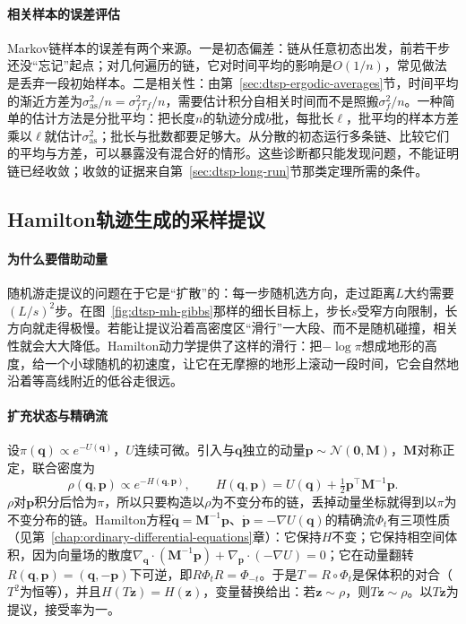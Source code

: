 \paragraph{相关样本的误差评估}
Markov链样本的误差有两个来源。一是初态偏差：链从任意初态出发，前若干步还没“忘记”起点；对几何遍历的链，它对时间平均的影响是$O(1/n)$，常见做法是丢弃一段初始样本。二是相关性：由第~\ref{sec:dtsp-ergodic-averages}节，时间平均的渐近方差为$\sigma_{\mathrm{as}}^2/n=\sigma_f^2\tau_f/n$，需要估计积分自相关时间而不是照搬$\sigma_f^2/n$。一种简单的估计方法是分批平均：把长度$n$的轨迹分成$b$批，每批长$\ell$，批平均的样本方差乘以$\ell$就估计$\sigma_{\mathrm{as}}^2$；批长与批数都要足够大。从分散的初态运行多条链、比较它们的平均与方差，可以暴露没有混合好的情形。这些诊断都只能发现问题，不能证明链已经收敛；收敛的证据来自第~\ref{sec:dtsp-long-run}节那类定理所需的条件。

\subsection{Hamilton轨迹生成的采样提议}
\label{sec:dtsp-hmc}

\paragraph{为什么要借助动量}
随机游走提议的问题在于它是“扩散”的：每一步随机选方向，走过距离$L$大约需要$(L/s)^2$步。在图~\ref{fig:dtsp-mh-gibbs}那样的细长目标上，步长$s$受窄方向限制，长方向就走得极慢。若能让提议沿着高密度区“滑行”一大段、而不是随机碰撞，相关性就会大大降低。Hamilton动力学提供了这样的滑行：把$-\log\pi$想成地形的高度，给一个小球随机的初速度，让它在无摩擦的地形上滚动一段时间，它会自然地沿着等高线附近的低谷走很远。

\paragraph{扩充状态与精确流}
设$\pi(\bm q)\propto e^{-U(\bm q)}$，$U$连续可微。引入与$\bm q$独立的动量$\bm p\sim\mathcal N(\bm 0,\bm M)$，$\bm M$对称正定，联合密度为
\[
  \rho(\bm q,\bm p)\propto e^{-H(\bm q,\bm p)},\qquad H(\bm q,\bm p)=U(\bm q)+\tfrac12\bm p^{\top}\bm M^{-1}\bm p.
\]
$\rho$对$\bm p$积分后恰为$\pi$，所以只要构造以$\rho$为不变分布的链，丢掉动量坐标就得到以$\pi$为不变分布的链。Hamilton方程$\dot{\bm q}=\bm M^{-1}\bm p$、$\dot{\bm p}=-\nabla U(\bm q)$的精确流$\Phi_t$有三项性质（见第~\ref{chap:ordinary-differential-equations}章）：它保持$H$不变；它保持相空间体积，因为向量场的散度$\nabla_{\bm q}\cdot(\bm M^{-1}\bm p)+\nabla_{\bm p}\cdot(-\nabla U)=0$；它在动量翻转$R(\bm q,\bm p)=(\bm q,-\bm p)$下可逆，即$R\Phi_tR=\Phi_{-t}$。于是$T=R\circ\Phi_t$是保体积的对合（$T^2$为恒等），并且$H(T\bm z)=H(\bm z)$，变量替换给出：若$\bm z\sim\rho$，则$T\bm z\sim\rho$。以$T\bm z$为提议，接受率为一。

